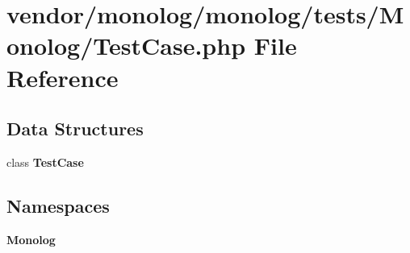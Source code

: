 \section{vendor/monolog/monolog/tests/\+Monolog/\+Test\+Case.php File Reference}
\label{vendor_2monolog_2monolog_2tests_2_monolog_2_test_case_8php}
\subsection*{Data Structures}
\begin{DoxyCompactItemize}
\item 
class {\bf Test\+Case}
\end{DoxyCompactItemize}
\subsection*{Namespaces}
\begin{DoxyCompactItemize}
\item 
 {\bf Monolog}
\end{DoxyCompactItemize}
